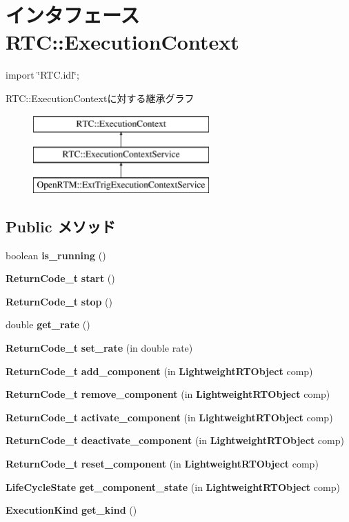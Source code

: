 \section{インタフェース RTC::ExecutionContext}
\label{interfaceRTC_1_1ExecutionContext}


{\ttfamily import \char`\"{}RTC.idl\char`\"{};}

RTC::ExecutionContextに対する継承グラフ\begin{figure}[H]
\begin{center}
\leavevmode
\includegraphics[height=3cm]{interfaceRTC_1_1ExecutionContext}
\end{center}
\end{figure}
\subsection*{Public メソッド}
\begin{DoxyCompactItemize}
\item 
boolean {\bf is\_\-running} ()
\item 
{\bf ReturnCode\_\-t} {\bf start} ()
\item 
{\bf ReturnCode\_\-t} {\bf stop} ()
\item 
double {\bf get\_\-rate} ()
\item 
{\bf ReturnCode\_\-t} {\bf set\_\-rate} (in double rate)
\item 
{\bf ReturnCode\_\-t} {\bf add\_\-component} (in {\bf LightweightRTObject} comp)
\item 
{\bf ReturnCode\_\-t} {\bf remove\_\-component} (in {\bf LightweightRTObject} comp)
\item 
{\bf ReturnCode\_\-t} {\bf activate\_\-component} (in {\bf LightweightRTObject} comp)
\item 
{\bf ReturnCode\_\-t} {\bf deactivate\_\-component} (in {\bf LightweightRTObject} comp)
\item 
{\bf ReturnCode\_\-t} {\bf reset\_\-component} (in {\bf LightweightRTObject} comp)
\item 
{\bf LifeCycleState} {\bf get\_\-component\_\-state} (in {\bf LightweightRTObject} comp)
\item 
{\bf ExecutionKind} {\bf get\_\-kind} ()
\end{DoxyCompactItemize}


